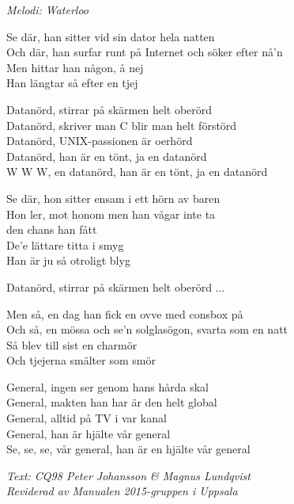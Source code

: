 {\footnotesize\textit{Melodi: Waterloo}}\par
\vspace{10pt}
Se där, han sitter vid sin dator hela natten\\
Och där, han surfar runt på Internet och söker efter nå'n\\
Men hittar han någon, å nej\\
Han längtar så efter en tjej\par
\vspace{10pt}
Datanörd, stirrar på skärmen helt oberörd\\
Datanörd, skriver man C blir man helt förstörd\\
Datanörd, UNIX-passionen är oerhörd\\
Datanörd, han är en tönt, ja en datanörd\\
W W W, en datanörd, han är en tönt, ja en datanörd\par
\vspace{10pt}
Se där, hon sitter ensam i ett hörn av baren\\
Hon ler, mot honom men han vågar inte ta\\
den chans han fått\\
De'e lättare titta i smyg\\
Han är ju så otroligt blyg\par
\vspace{10pt}
Datanörd, stirrar på skärmen helt oberörd ...\par
\vspace{10pt}
Men så, en dag han fick en ovve med consbox på\\
Och så, en mössa och se'n solglasögon, svarta som en natt\\
Så blev till sist en charmör\\
Och tjejerna smälter som smör\par
\newpage
General, ingen ser genom hans hårda skal\\
General, makten han har är den helt global\\
General, alltid på TV i var kanal\\
General, han är hjälte vår general\\
Se, se, se, vår general, han är en hjälte vår general\par
\vspace{10pt}
{\footnotesize\textit{Text: CQ98 Peter Johansson \& Magnus Lundqvist\\
Reviderad av Manualen 2015-gruppen i Uppsala}}
